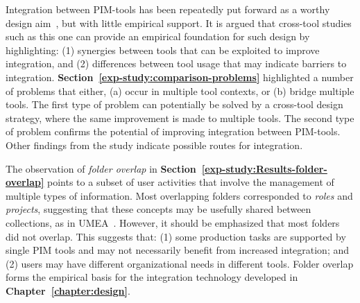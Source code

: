 Integration between PIM-tools has been repeatedly put forward as a worthy design aim~\citep{Bellotti:03,Bergman:03,rpb:01a,Dumais:03a,Kaptelinin:03}, but with little empirical support.  It is argued that cross-tool studies such as this one can provide an empirical foundation for such design by highlighting: (1) synergies between tools that can be exploited to improve integration, and (2) differences between tool usage that may indicate barriers to integration.
\textbf{Section~\ref{exp-study:comparison-problems}} highlighted a number of problems that either, (a) occur in multiple tool contexts, or (b) bridge multiple tools.  The first type of problem can potentially be solved by a cross-tool design strategy, where the same improvement is made to multiple tools.  The second type of problem confirms the potential of improving integration between PIM-tools. Other findings from the study indicate possible routes for integration. %

The observation of \textit{folder overlap} in \textbf{Section~\ref{exp-study:Results-folder-overlap}} points to a subset of user activities that involve the management of multiple types of information.  Most overlapping folders corresponded to \textit{roles} and \textit{projects}, suggesting that these concepts may be usefully shared between collections, as in UMEA~\citep{Kaptelinin:03}. However, it should be emphasized that most folders did not overlap. This suggests that: (1) some production tasks are supported by single PIM tools and may not necessarily benefit from increased integration; and (2) users may have different organizational needs in different tools.  Folder overlap forms the empirical basis for the integration technology developed in \textbf{Chapter~\ref{chapter:design}}.

